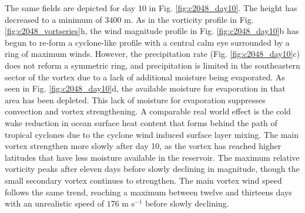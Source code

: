    The same fields are depicted
   for day 10 in Fig. \ref{fig:c2048_day10}. The height has decreased to a minimum of $3400$ m.
   As in the vorticity profile in Fig. \ref{fig:c2048_vortseries}h, the wind magnitude profile in 
   Fig. \ref{fig:c2048_day10}b has begun to re-form a cyclone-like profile with a central calm eye
   surrounded by a ring of maximum winds. However, the precipitation rate 
   (Fig. \ref{fig:c2048_day10}c) does not reform a symmetric ring, and precipitation is limited
   in the southeastern sector of the vortex due to a lack of additional moisture
   being evaporated. As seen in Fig. \ref{fig:c2048_day10}d, the available moisture
   for evaporation in that area has been depleted. This lack of moisture for evaporation suppresses 
   convection and vortex strengthening. A comparable real world effect is
   the cold wake reduction in ocean surface heat content that forms 
   behind the path of tropical cyclones due to the cyclone wind induced surface layer mixing.  
   The main vortex strengthen more slowly
   after day 10, as the vortex has reached higher latitudes that have less 
   moisture available in the reservoir. The maximum relative vorticity peaks after eleven days before slowly
   declining in magnitude, though the small secondary vortex continues to strengthen. 
   The main vortex wind speed follows the same trend, reaching a maximum between twelve and thirteens days with an unrealistic
   speed of $176$ m s$^{-1}$ before slowly declining.
   
           
